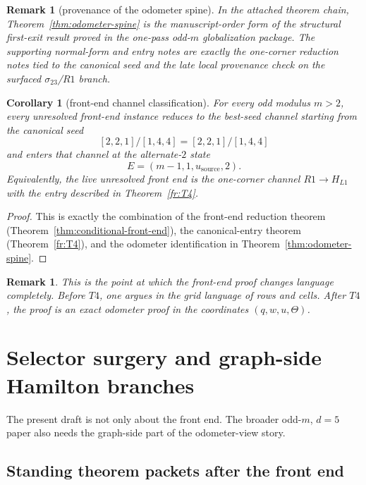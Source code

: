 \documentclass[11pt]{article}
\newtheorem{corollary}[theorem]{Corollary}
\newtheorem{remark}[theorem]{Remark}
\newcommand{\CanL}{[2,2,1]}
\newcommand{\CanR}{[1,4,4]}
\newcommand{\CanSeed}{\CanL/\CanR}
\begin{document}
\begin{remark}[provenance of the odometer spine]
In the attached theorem chain, Theorem~\ref{thm:odometer-spine} is the
manuscript-order form of the structural first-exit result proved in the one-pass
odd-$m$ globalization package.
The supporting normal-form and entry notes are exactly the one-corner reduction
notes tied to the canonical seed and the late local provenance check on the
surfaced $\sigma_{23}$/$R1$ branch.
\end{remark}

\begin{corollary}[front-end channel classification]
\label{cor:channel-classification}
For every odd modulus $m>2$, every unresolved front-end instance reduces to the
best-seed channel starting from the canonical seed
\[
\CanSeed=[2,2,1]/[1,4,4]
\]
and enters that channel at the alternate-$2$ state
\[
E=(m-1,1,u_{\mathrm{source}},2).
\]
Equivalently, the live unresolved front end is the one-corner channel
$R1\to H_{L1}$ with the entry described in Theorem~\ref{fr:T4}.
\end{corollary}

\begin{proof}
This is exactly the combination of the front-end reduction theorem
(Theorem~\ref{thm:conditional-front-end}), the canonical-entry theorem
(Theorem~\ref{fr:T4}), and the odometer identification in
Theorem~\ref{thm:odometer-spine}.
\end{proof}

\begin{remark}
This is the point at which the front-end proof changes language completely.
Before \(T4\), one argues in the grid language of rows and cells.
After \(T4\), the proof is an exact odometer proof in the coordinates
\((q,w,u,\Theta)\).
\end{remark}

\section{Selector surgery and graph-side Hamilton branches}
\label{sec:selector-surgery}

The present draft is not only about the front end.
The broader odd-$m$, $d=5$ paper also needs the graph-side part of the
odometer-view story.

\subsection{Standing theorem packets after the front end}
\end{document}
